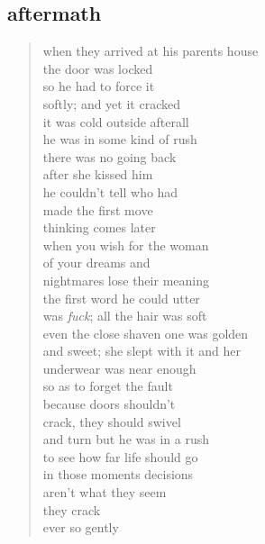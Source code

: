 \documentclass[11pt]{article}
\begin{document}
\subsection{aftermath}
\label{sec:org95d3193}
\begin{verse}
when they arrived at his parents house\\
the door was locked\\
so he had to force it\\
softly; and yet it cracked\\
it was cold outside afterall\\
he was in some kind of rush\\
there was no going back\\
after she kissed him\\
\vspace*{1em}
he couldn't tell who had\\
made the first move\\
thinking comes later\\
when you wish for the woman\\
of your dreams and\\
nightmares lose their meaning\\
the first word he could utter\\
was \textit{fuck}; all the hair was soft\\
even the close shaven one was golden\\
and sweet; she slept with it and her\\
underwear was near enough\\
so as to forget the fault\\
\vspace*{1em}
because doors shouldn't\\
crack, they should swivel\\
and turn but he was in a rush\\
to see how far life should go\\
in those moments decisions\\
aren't what they seem\\
they crack\\
ever so gently\\
\end{verse}
\end{document}
